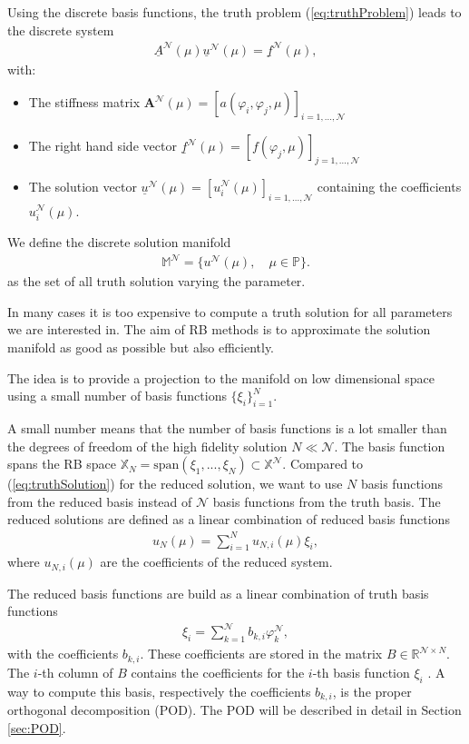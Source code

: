 Using the discrete basis functions, the truth problem (\ref{eq:truthProblem}) leads to the discrete system 
\begin{align*}
\underline{A}^\mathcal{ N } (\mu) \underline{u}^\mathcal{ N } (\mu) = 
\underline{f}^\mathcal{ N }(\mu),
\end{align*}
with:
\begin{itemize}
	\item The stiffness matrix $\mathbf{A}^\mathcal{ N } (\mu) = [a(\varphi_i,\varphi_j,\mu)]_{i=1,...,\mathcal{N}}$ 
	\item The right hand side vector $\underline{f}^\mathcal{ N } (\mu) = [f(\varphi_j,\mu)]_{j=1,...,\mathcal{N}}$
	\item The solution vector $\underline{u}^\mathcal{ N } (\mu) = [u_i^\mathcal{ N }(\mu)]_{i=1,...,\mathcal{N}}$ containing  the coefficients $u_i^\mathcal{ N } (\mu)$. 
\end{itemize}

We define the discrete solution manifold
\begin{align*}
\mathbb{M^\mathcal{N}} = \{u^\mathcal{N}(\mu),\quad \mu \in \mathbb{P}\}.
\end{align*}
as the set of all truth solution varying the parameter.

In many cases it is too expensive to compute a truth solution for all parameters we are interested in.
The aim of RB methods is to approximate the solution manifold as good as possible but also efficiently.

The idea is to provide a projection to the manifold on low dimensional space using a small number of basis functions $\{\xi_i\}_{i=1}^{N}$.

A small number means that the number of basis functions is a lot smaller than the degrees of freedom of the high fidelity solution $N \ll \mathcal{ N }$.
The basis function spans the RB space $ \mathbb{X}_N = \text{span}(\xi_1, ...,\xi_N )\subset \mathbb{X}^\mathcal{ N } $.
Compared to (\ref{eq:truthSolution}) for the reduced solution, we want to use $N$ basis functions from the reduced basis instead of $\mathcal{ N }$ basis functions from the truth basis.
The reduced solutions are defined as a linear combination of reduced basis functions
\begin{align*}
u_N(\mu) = \sum_{i=1}^{N} u_{N,i}(\mu) \xi_i,
\end{align*}
where $ u_{N,i}(\mu)$ are the coefficients of the reduced system.

The reduced basis functions are build as a linear combination of truth basis functions
\begin{align}
\label{eq:basisfun}
\xi_i  = \sum_{k=1}^{\mathcal{ N }} b_{k,i} \varphi_k^\mathcal{ N },
\end{align}
with the coefficients  $b_{k,i}$. These coefficients are stored in the matrix $B \in \mathbb{R}^{\mathcal{ N } \times N}$. The $i$-th column of $B$ contains the coefficients for the $i$-th basis function $\xi_i$ \cite[Section 3.1]{HRSbook}.
A way to compute this basis, respectively the coefficients $b_{k,i}$, is the proper orthogonal decomposition (POD).
The POD will be described in detail in Section \ref{sec:POD}. 

